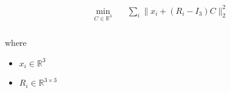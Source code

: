 \documentclass[12pt]{article}
\begin{document}
\begin{align*}
 & \begin{aligned} \min_{\textit{C} \in \mathbb{R}^{ 3}} \quad & \sum_\textit{i} \|\textit{x}_{ \textit{i} } + \left( \textit{R}_{ \textit{i} } - I_{ 3 } \right)\textit{C}\|_2^{2} \\
\end{aligned}
\end{align*}

where
\begin{itemize}
\item $\textit{x}_{\textit{i}} \in \mathbb{R}^{ 3}$
\item $\textit{R}_{\textit{i}} \in \mathbb{R}^{ 3 \times 3 }$
\end{itemize}
\end{document}
